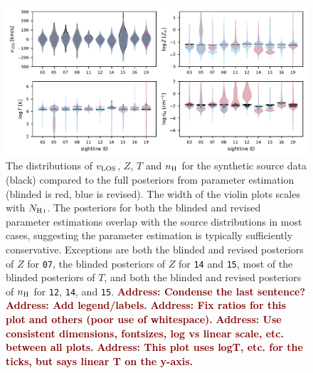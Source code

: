 \documentclass[fleqn,usenatbib]{mnras}
\newcommand{\todo}[1]{\textcolor{Maroon}{\textbf{Address: #1}}}
\begin{document}
\begin{figure}
    \centering
    \includegraphics[width=\textwidth]{figures/sample2/violin.pdf}
    \caption{
    The distributions of $v_{\rm LOS}$, $Z$, $T$ and $n_{\rm H}$ for the synthetic source data (black) compared to the full posteriors from parameter estimation (blinded is red, blue is revised).
    The width of the violin plots scales with $N_{\ion{H}{I}}$.
    The posteriors for both the blinded and revised parameter estimations overlap with the source distributions in most cases, suggesting the parameter estimation is typically sufficiently conservative.
    Exceptions are
    both the blinded and revised posteriors of $Z$ for \texttt{07},
    the blinded posteriors of $Z$ for \texttt{14} and \texttt{15},
    most of the blinded posteriors of $T$,
    and both the blinded and revised posteriors of $n_{\rm H}$ for \texttt{12}, \texttt{14}, and \texttt{15}.
    \todo{Condense the last sentence?}
    \todo{Add legend/labels.}
    \todo{Fix ratios for this plot and others (poor use of whitespace).}
    \todo{Use consistent dimensions, fontsizes, log vs linear scale, etc. between all plots.}
    \todo{This plot uses logT, etc. for the ticks, but says linear T on the y-axis.}
    }
    \label{f: sample2 violin}
\end{figure}
\end{document}
